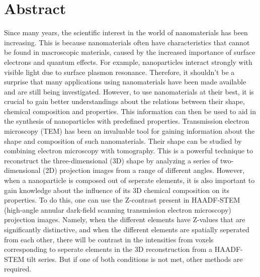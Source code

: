 \documentclass{report}
\begin{document}
\chapter*{Abstract}
Since many years, the scientific interest in the world of nanomaterials has been increasing. This is because nanomaterials often have characteristics that cannot be found in macroscopic materials, caused by the increased importance of surface electrons and quantum effects. For example, nanoparticles interact strongly with visible light due to surface plasmon resonance. Therefore, it shouldn't be a surprise that many applications using nanomaterials have been made available and are still being investigated. However, to use nanomaterials at their best, it is crucial to gain better understandings about the relations between their shape, chemical composition and properties. This information can then be used to aid in the synthesis of nanoparticles with predefined properties. Transmission electron microscopy (TEM) has been an invaluable tool for gaining information about the shape and composition of such nanomaterials. Their shape can be studied by combining electron microscopy with tomography. This is a powerful technique to reconstruct the three-dimensional (3D) shape by analyzing a series of two-dimensional (2D) projection images from a range of different angles. However, when a nanoparticle is composed out of seperate elements, it is also important to gain knowledge about the influence of its 3D chemical composition on its properties. To do this, one can use the Z-contrast present in HAADF-STEM (high-angle annular dark-field scanning transmission electron microscopy) projection images. Namely, when the different elements have Z-values that are significantly distinctive, and when the different elements are spatially seperated from each other, there will be contrast in the intensities from voxels corresponding to seperate elements in the 3D reconstruction from a HAADF-STEM tilt series. But if one of both conditions is not met, other methods are required.
\\ \\
\end{document}
